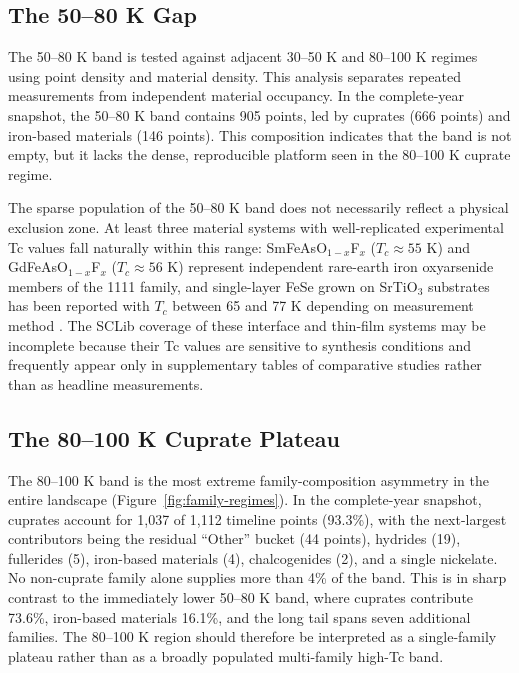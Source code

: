 \documentclass[11pt]{article}
\begin{document}
\subsection{The 50--80 K Gap}

The 50--80 K band is tested against adjacent 30--50 K and 80--100 K regimes using point density and material density. This analysis separates repeated measurements from independent material occupancy. In the complete-year snapshot, the 50--80 K band contains 905 points, led by cuprates (666 points) and iron-based materials (146 points). This composition indicates that the band is not empty, but it lacks the dense, reproducible platform seen in the 80--100 K cuprate regime.

The sparse population of the 50--80 K band does not necessarily reflect a physical exclusion zone. At least three material systems with well-replicated experimental Tc values fall naturally within this range: SmFeAsO$_{1-x}$F$_x$ ($T_c \approx 55$ K) and GdFeAsO$_{1-x}$F$_x$ ($T_c \approx 56$ K) represent independent rare-earth iron oxyarsenide members of the 1111 family, and single-layer FeSe grown on SrTiO$_3$ substrates has been reported with $T_c$ between 65 and 77 K depending on measurement method \cite{he2013fese,ge2015fese}. The SCLib coverage of these interface and thin-film systems may be incomplete because their Tc values are sensitive to synthesis conditions and frequently appear only in supplementary tables of comparative studies rather than as headline measurements.

\subsection{The 80--100 K Cuprate Plateau}

The 80--100 K band is the most extreme family-composition asymmetry in the entire landscape (Figure~\ref{fig:family-regimes}). In the complete-year snapshot, cuprates account for 1{,}037 of 1{,}112 timeline points (93.3\%), with the next-largest contributors being the residual ``Other'' bucket (44 points), hydrides (19), fullerides (5), iron-based materials (4), chalcogenides (2), and a single nickelate. No non-cuprate family alone supplies more than 4\% of the band. This is in sharp contrast to the immediately lower 50--80 K band, where cuprates contribute 73.6\%, iron-based materials 16.1\%, and the long tail spans seven additional families. The 80--100 K region should therefore be interpreted as a single-family plateau rather than as a broadly populated multi-family high-Tc band.
\end{document}
